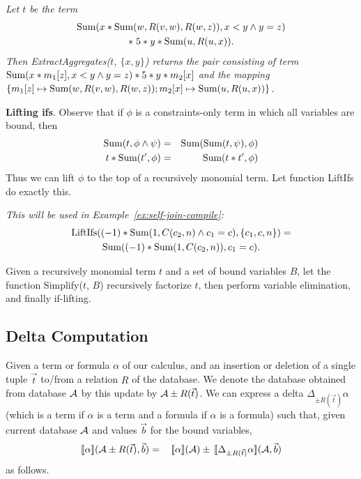 \begin{example}\em
Let $t$ be the term
\begin{multline*}
\mbox{Sum}(x*\mbox{Sum}(w, R(v, w), R(w, z)), x<y \land y=z) \\
*\; 5 * y * \mbox{Sum}(u, R(u, x)).
\end{multline*}
Then ExtractAggregates($t$, $\{x,y\}$) returns the pair consisting of term
$\mbox{Sum}(x*m_1[z], x<y \land y=z) * 5 * y * m_2[x]$
and the mapping
$\{
m_1[z] \mapsto \mbox{Sum}(w, R(v, w), R(w, z));
m_2[x] \mapsto \mbox{Sum}(u, R(u, x))
\}$.
\punto
\end{example}


{\bf Lifting ifs}. Observe that if $\phi$ is a constraints-only term in which
all variables are bound, then
\begin{eqnarray*}
\mbox{Sum}(t, \phi \land \psi) &=& \mbox{Sum}(\mbox{Sum}(t, \psi), \phi) \\
t * \mbox{Sum}(t', \phi) &=& \mbox{Sum}(t * t', \phi)
\end{eqnarray*}
Thus we can lift $\phi$ to the top of a recursively monomial term.
Let function LiftIfs do exactly this.

\begin{example}\em
This will be used in Example~\ref{ex:self-join-compile}:
\begin{multline*}
\mbox{LiftIfs}((-1) * \mbox{Sum}(1, C(c_2, n) \land c_1=c), \{c_1, c, n\}) = \\
\mbox{Sum}((-1) * \mbox{Sum}(1, C(c_2, n)), c_1=c).
\end{multline*}
\end{example}


Given a recursively monomial term $t$ and a set of bound variables $B$,
let the function Simplify($t$, $B$) recursively factorize $t$, then perform
variable elimination, and finally if-lifting.


\subsection{Delta Computation}


\def\dt{\Delta_{\pm R(\vec{t})}}


Given a term or formula $\alpha$
of our calculus, and an insertion or deletion of a
single tuple $\vec{t}$ to/from a relation $R$ of the database.
We denote the database obtained from database $\db$ by this update by
$\db \pm R(\vec{t})$.
We can express a delta $\Delta_{\pm R(\vec{t})} \alpha$
(which is a term if $\alpha$ is a term and a formula if $\alpha$ is a formula)
such that,
given current database $\db$ and values $\vec{b}$ for the bound variables,
\begin{eqnarray}
\Bracks{\alpha}(\db \pm R(\vec{t}), \vec{b}) &=&
\,\Bracks{\alpha}(\db) \pm \,\Bracks{\dt \alpha}(\db, \vec{b})
\label{eq:delta}
\end{eqnarray}
as follows.

